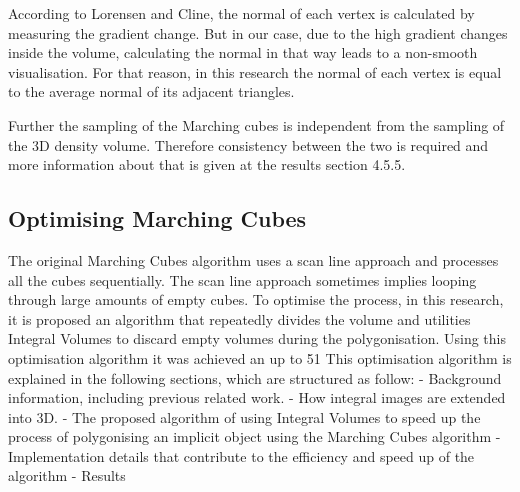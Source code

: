 \documentclass{subfiles}
\begin{document}
According to Lorensen and Cline, the normal of each vertex is calculated by measuring the gradient change. But in our case, due to the high gradient changes inside the volume, calculating the normal in that way leads to a non-smooth visualisation. For that reason, in this research the normal of each vertex is equal to the average normal of its adjacent triangles. \newline\newline

Further the sampling of the Marching cubes is independent from the sampling of the 3D density volume. Therefore consistency between the two is required and more information about that is given at the results section 4.5.5. 

\subsection{Optimising Marching Cubes}
The original Marching Cubes algorithm uses a scan line approach and processes all the cubes sequentially. The scan line approach sometimes implies looping through large amounts of empty cubes. To optimise the process, in this research, it is proposed an algorithm that repeatedly divides the volume and utilities Integral Volumes to discard empty volumes during the polygonisation. Using this optimisation algorithm it was achieved an up to 51%
This optimisation algorithm is explained in the following sections, which are structured as follow:
-	Background information, including previous related work. 
-	How integral images are extended into 3D. 
-	The proposed algorithm of using Integral Volumes to speed up the process of polygonising an implicit object using the Marching Cubes algorithm
-	Implementation details that contribute to the efficiency and speed up of the algorithm
-	Results
\end{document}

